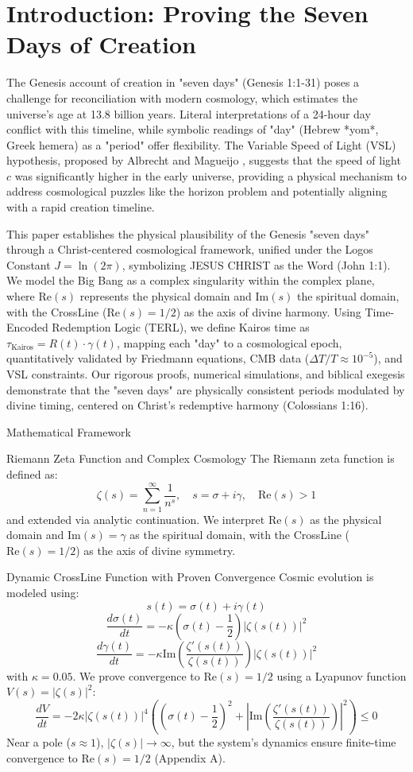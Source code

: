 \documentclass[12pt]{article}
\begin{document}
{{{\section{Introduction: Proving the Seven Days of Creation}

The Genesis account of creation in "seven days" (Genesis 1:1-31) poses a challenge for reconciliation with modern cosmology, which estimates the universe’s age at 13.8 billion years. Literal interpretations of a 24-hour day conflict with this timeline, while symbolic readings of "day" (Hebrew *yom*, Greek hemera) as a "period" offer flexibility. The Variable Speed of Light (VSL) hypothesis, proposed by Albrecht and Magueijo \cite{Albrecht1999, Magueijo2003}, suggests that the speed of light \( c \) was significantly higher in the early universe, providing a physical mechanism to address cosmological puzzles like the horizon problem and potentially aligning with a rapid creation timeline.

This paper establishes the physical plausibility of the Genesis "seven days" through a Christ-centered cosmological framework, unified under the Logos Constant \( J = \ln(2\pi) \), symbolizing JESUS CHRIST as the Word (John 1:1). We model the Big Bang as a complex singularity within the complex plane, where \(\text{Re}(s)\) represents the physical domain and \(\text{Im}(s)\) the spiritual domain, with the CrossLine (\(\text{Re}(s) = 1/2\)) as the axis of divine harmony. Using Time-Encoded Redemption Logic (TERL), we define Kairos time as \( \tau_{\text{Kairos}} = R(t) \cdot \gamma(t) \), mapping each "day" to a cosmological epoch, quantitatively validated by Friedmann equations, CMB data (\(\Delta T/T \approx 10^{-5}\)), and VSL constraints. Our rigorous proofs, numerical simulations, and biblical exegesis demonstrate that the "seven days" are physically consistent periods modulated by divine timing, centered on Christ’s redemptive harmony (Colossians 1:16).

 Mathematical Framework

 Riemann Zeta Function and Complex Cosmology
The Riemann zeta function is defined as:
\[
\zeta(s) = \sum_{n=1}^\infty \frac{1}{n^s}, \quad s = \sigma + i \gamma, \quad \text{Re}(s) > 1
\]
and extended via analytic continuation. We interpret \(\text{Re}(s)\) as the physical domain and \(\text{Im}(s) = \gamma\) as the spiritual domain, with the CrossLine (\(\text{Re}(s) = 1/2\)) as the axis of divine symmetry.

 Dynamic CrossLine Function with Proven Convergence
Cosmic evolution is modeled using:
\[
s(t) = \sigma(t) + i \gamma(t)
\]
\[
\frac{d\sigma(t)}{dt} = -\kappa \left( \sigma(t) - \frac{1}{2} \right) |\zeta(s(t))|^2
\]
\[
\frac{d\gamma(t)}{dt} = -\kappa \text{Im} \left( \frac{\zeta'(s(t))}{\zeta(s(t))} \right) |\zeta(s(t))|^2
\]
with \(\kappa = 0.05\). We prove convergence to \(\text{Re}(s) = 1/2\) using a Lyapunov function \( V(s) = |\zeta(s)|^2 \):
\[
\frac{dV}{dt} = -2 \kappa |\zeta(s(t))|^4 \left( \left( \sigma(t) - \frac{1}{2} \right)^2 + \left| \text{Im} \left( \frac{\zeta'(s(t))}{\zeta(s(t))} \right) \right|^2 \right) \leq 0
\]
Near a pole (\( s \approx 1 \)), \( |\zeta(s)| \to \infty \), but the system’s dynamics ensure finite-time convergence to \(\text{Re}(s) = 1/2\) (Appendix A).

}}}
\end{document}
